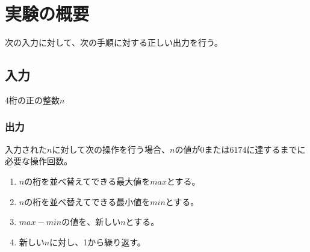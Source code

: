 

\section{実験の概要}
  次の入力に対して、次の手順に対する正しい出力を行う。
  \subsection{入力}
    4桁の正の整数$n$
  \subsubsection{出力}
    入力された$n$に対して次の操作を行う場合、$n$の値が$0$または$6174$に達するまでに必要な操作回数。
    \begin{enumerate}
      \item $n$の桁を並べ替えてできる最大値を$max$とする。
      \item $n$の桁を並べ替えてできる最小値を$min$とする。
      \item $max - min$の値を、新しい$n$とする。
      \item 新しい$n$に対し、1から繰り返す。
    \end{enumerate}


